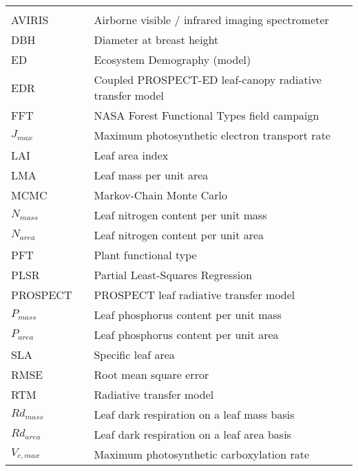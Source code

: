 \begin{center}
  \begin{tabular}{lll}
    \hspace*{2em} & \hspace*{1in} & \hspace*{4.5in} \\
    AVIRIS & \dotfill & Airborne visible / infrared imaging spectrometer \\
    DBH & \dotfill & Diameter at breast height \\
    ED & \dotfill & Ecosystem Demography (model) \\
    EDR & \dotfill & Coupled PROSPECT-ED leaf-canopy radiative transfer model \\
    FFT & \dotfill & NASA Forest Functional Types field campaign \\
    $J_{max}$ & \dotfill & Maximum photosynthetic electron transport rate \\
    LAI & \dotfill & Leaf area index \\
    LMA & \dotfill & Leaf mass per unit area \\
    MCMC & \dotfill & Markov-Chain Monte Carlo \\
    $N_{mass}$ & \dotfill & Leaf nitrogen content per unit mass \\
    $N_{area}$ & \dotfill & Leaf nitrogen content per unit area \\
    PFT & \dotfill & Plant functional type \\
    PLSR & \dotfill & Partial Least-Squares Regression \\
    PROSPECT & \dotfill & PROSPECT leaf radiative transfer model \\
    $P_{mass}$ & \dotfill & Leaf phosphorus content per unit mass \\
    $P_{area}$ & \dotfill & Leaf phosphorus content per unit area \\
    SLA & \dotfill & Specific leaf area \\
    RMSE & \dotfill & Root mean square error \\
    RTM & \dotfill & Radiative transfer model \\
    $Rd_{mass}$ & \dotfill & Leaf dark respiration on a leaf mass basis \\
    $Rd_{area}$ & \dotfill & Leaf dark respiration on a leaf area basis \\
    $V_{c,max}$ & \dotfill & Maximum photosynthetic carboxylation rate \\
  \end{tabular}
\end{center}
\cleardoublepage


\newpage
\endofprelim
